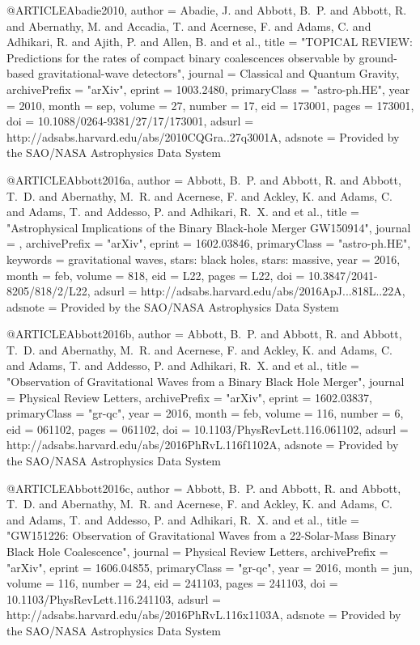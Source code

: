 \documentclass[twocolumn,tighten]{aastex63}
\begin{document}
{{{{{@ARTICLE{Abadie2010,
   author = {{Abadie}, J. and {Abbott}, B.~P. and {Abbott}, R. and {Abernathy}, M. and 
	{Accadia}, T. and {Acernese}, F. and {Adams}, C. and {Adhikari}, R. and 
	{Ajith}, P. and {Allen}, B. and et al.},
    title = "{TOPICAL REVIEW:  Predictions for the rates of compact binary coalescences observable by ground-based gravitational-wave detectors}",
  journal = {Classical and Quantum Gravity},
archivePrefix = "arXiv",
   eprint = {1003.2480},
 primaryClass = "astro-ph.HE",
     year = 2010,
    month = sep,
   volume = 27,
   number = 17,
      eid = {173001},
    pages = {173001},
      doi = {10.1088/0264-9381/27/17/173001},
   adsurl = {http://adsabs.harvard.edu/abs/2010CQGra..27q3001A},
  adsnote = {Provided by the SAO/NASA Astrophysics Data System}
}


@ARTICLE{Abbott2016a,
   author = {{Abbott}, B.~P. and {Abbott}, R. and {Abbott}, T.~D. and {Abernathy}, M.~R. and 
	{Acernese}, F. and {Ackley}, K. and {Adams}, C. and {Adams}, T. and 
	{Addesso}, P. and {Adhikari}, R.~X. and et al.},
    title = "{Astrophysical Implications of the Binary Black-hole Merger GW150914}",
  journal = {\apjl},
archivePrefix = "arXiv",
   eprint = {1602.03846},
 primaryClass = "astro-ph.HE",
 keywords = {gravitational waves, stars: black holes, stars: massive},
     year = 2016,
    month = feb,
   volume = 818,
      eid = {L22},
    pages = {L22},
      doi = {10.3847/2041-8205/818/2/L22},
   adsurl = {http://adsabs.harvard.edu/abs/2016ApJ...818L..22A},
  adsnote = {Provided by the SAO/NASA Astrophysics Data System}
}

@ARTICLE{Abbott2016b,
   author = {{Abbott}, B.~P. and {Abbott}, R. and {Abbott}, T.~D. and {Abernathy}, M.~R. and 
	{Acernese}, F. and {Ackley}, K. and {Adams}, C. and {Adams}, T. and 
	{Addesso}, P. and {Adhikari}, R.~X. and et al.},
    title = "{Observation of Gravitational Waves from a Binary Black Hole Merger}",
  journal = {Physical Review Letters},
archivePrefix = "arXiv",
   eprint = {1602.03837},
 primaryClass = "gr-qc",
     year = 2016,
    month = feb,
   volume = 116,
   number = 6,
      eid = {061102},
    pages = {061102},
      doi = {10.1103/PhysRevLett.116.061102},
   adsurl = {http://adsabs.harvard.edu/abs/2016PhRvL.116f1102A},
  adsnote = {Provided by the SAO/NASA Astrophysics Data System}
}

@ARTICLE{Abbott2016c,
   author = {{Abbott}, B.~P. and {Abbott}, R. and {Abbott}, T.~D. and {Abernathy}, M.~R. and 
	{Acernese}, F. and {Ackley}, K. and {Adams}, C. and {Adams}, T. and 
	{Addesso}, P. and {Adhikari}, R.~X. and et al.},
    title = "{GW151226: Observation of Gravitational Waves from a 22-Solar-Mass Binary Black Hole Coalescence}",
  journal = {Physical Review Letters},
archivePrefix = "arXiv",
   eprint = {1606.04855},
 primaryClass = "gr-qc",
     year = 2016,
    month = jun,
   volume = 116,
   number = 24,
      eid = {241103},
    pages = {241103},
      doi = {10.1103/PhysRevLett.116.241103},
   adsurl = {http://adsabs.harvard.edu/abs/2016PhRvL.116x1103A},
  adsnote = {Provided by the SAO/NASA Astrophysics Data System}
}

}}}}}
\end{document}
